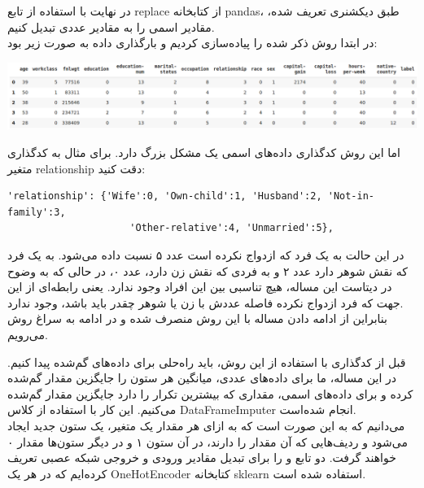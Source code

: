 \documentclass{article}
\begin{document}
در نهایت با استفاده از تابع replace از کتابخانه pandas، طبق دیکشنری تعریف شده، مقادیر اسمی را به مقادیر عددی تبدیل کنیم. \\

در ابتدا روش ذکر شده را پیاده‌سازی کردیم و بارگذاری داده به صورت زیر بود:

\begin{center}
	\includegraphics[scale=0.35]{df_numeric.png} 
\end{center}    

اما این روش کدگذاری داده‌های اسمی یک مشکل بزرگ دارد. برای مثال به کدگذاری متغیر relationship دقت کنید:


\begin{latin}
\begin{lstlisting}
'relationship': {'Wife':0, 'Own-child':1, 'Husband':2, 'Not-in-family':3,
                     'Other-relative':4, 'Unmarried':5},
\end{lstlisting}
\end{latin}

در این حالت به یک فرد که ازدواج نکرده‌ است عدد ۵ نسبت داده می‌شود. به یک فرد که نقش شوهر دارد عدد ۲ و به فردی که نقش زن دارد، عدد ۰، در حالی که به وضوح در دیتاست این مساله، هیچ تناسبی بین این افراد وجود ندارد. یعنی رابطه‌ای از این جهت که فرد ازدواج نکرده فاصله‌ عددش با زن یا شوهر چقدر باید باشد، وجود ندارد. \\

بنابراین از ادامه دادن مساله با این روش منصرف شده و در ادامه به سراغ روش  می‌رویم.

قبل از کدگذاری با استفاده از این روش، باید راه‌حلی برای داده‌های گم‌شده پیدا کنیم. در این مساله، ما برای داده‌های عددی، میانگین هر ستون را جایگزین مقدار گم‌شده کرده و برای داده‌های اسمی، مقداری که بیشترین تکرار را دارد جایگزین مقدار گم‌شده می‌کنیم. این کار با استفاده از کلاس DataFrameImputer انجام شده‌است. \\

می‌دانیم که  به این صورت است که به ازای هر مقدار یک متغیر، یک ستون جدید ایجاد می‌شود و ردیف‌هایی که آن مقدار را دارند، در آن ستون ۱ و در دیگر ستون‌ها مقدار ۰ خواهند گرفت. دو تابع  و  را برای تبدیل مقادیر ورودی و خروجی شبکه عصبی تعریف کرده‌ایم که در هر یک OneHotEncoder کتابخانه sklearn استفاده شده است.
\end{document}
